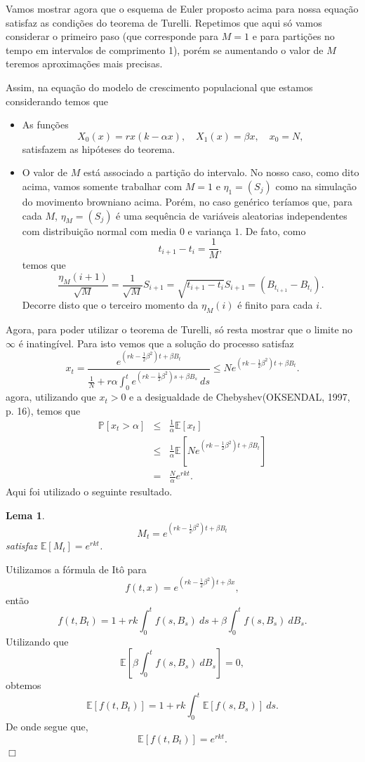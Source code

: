 \documentclass[12pt]{article}
\newtheorem{lem}[teo]{Lema}
\newenvironment{proof}{\noindent{\it Demonstra\c{c}\~ao.} }{\hfill $\Box$ \newline}
\newcommand{\me}{\mathbb{E}}
\begin{document}
Vamos mostrar agora que o esquema de Euler proposto acima para nossa equação satisfaz as condições do teorema de Turelli. Repetimos que aqui só vamos considerar o primeiro paso (que corresponde para $M=1$ e para partições no tempo em intervalos de comprimento 1), porém se aumentando o valor de $M$ teremos aproximações mais precisas. 

Assim, na equação do modelo de crescimento populacional que estamos considerando temos  que
\begin{itemize}
\item As funções 
\[X_0(x)= rx (k-\alpha x ),\quad X_1(x) = \beta x,\quad   x_0 = N,\]  satisfazem as hipóteses do teorema. 
\item O valor de $M$ está associado a partição do intervalo. No nosso caso, como dito acima, vamos somente trabalhar com $M=1$ e $\eta_1=(S_j)$ como na simulação do movimento browniano acima. Porém, no caso genérico teríamos que, para cada $M$, $\eta_M=(S_j)$ é uma sequência de variáveis aleatorias independentes com distribuição normal com media $0$ e variança $1$.  De fato,  como 
\[t_{i+1}-t_{i}=\frac{1}{M},\] temos que 
\[
\frac{\eta_M(i+1)}{\sqrt{M}}=\frac{1}{\sqrt{M}}S_{i+1}=\sqrt{t_{i+1}-t_i}S_{i+1}=(B_{t_{i+1}}-B_{t_i}).
\]
Decorre disto que o terceiro momento  da $\eta_M(i)$ é finito para cada $i$.
 \end{itemize} 
Agora, para poder utilizar o teorema de Turelli, só resta mostrar que o limite no $\infty$ é inatingível. Para isto vemos que a solução do processo satisfaz
\[
x_t=\frac{e^{\left(rk-\frac{1}{2}\beta^2\right)t+\beta B_t}}{\frac{1}{N}+r\alpha\int_0^te^{\left(rk-\frac{1}{2}\beta^2\right)s+\beta B_s}~ds}\leq Ne^{\left(rk-\frac{1}{2}\beta^2\right)t+\beta B_t}.
\]
agora, utilizando que $x_t>0$ e a desigualdade de Chebyshev(OKSENDAL, 1997, p. 16), temos que 
\begin{eqnarray*}
\mathbb{P}[x_t>\alpha]&\leq&\frac{1}{\alpha}\mathbb{E}[x_t]\\
&\leq&\frac{1}{\alpha}\mathbb{E}\left[Ne^{\left(rk-\frac{1}{2}\beta^2\right)t+\beta B_t}\right]\\
&=&\frac{N}{\alpha}e^{rkt}.
\end{eqnarray*}
Aqui foi utilizado o seguinte resultado. 


\begin{lem}\label{M_t}
\[M_t=e^{\left(rk-\frac{1}{2}\beta^2\right)t+\beta B_t}\]
satisfaz $\me[M_t]=e^{rkt}$.
\end{lem}

\begin{proof}
Utilizamos a fórmula de Itô para 
\[
f(t,x)=e^{\left(rk-\frac{1}{2}\beta^2\right)t+\beta x},
\]
então 
\[
f(t,B_t)=1+rk\int_0^tf(s,B_s)~ds+\beta\int_0^tf(s,B_s)~dB_s.
\]
Utilizando que 
\[\me\left[\beta\int_0^tf(s,B_s)~dB_s\right]=0,\]
obtemos 
\[
\me[f(t,B_t)]=1+rk\int_0^t\me[f(s,B_s)]~ds.
\]
De onde segue que,
\[
\me[f(t,B_t)]=e^{rkt}.
\]
\end{proof}
\end{document}
